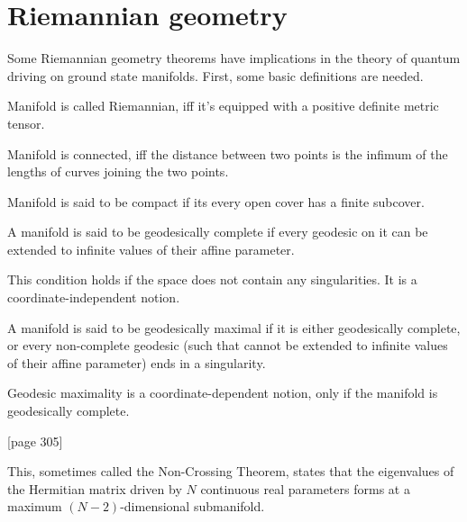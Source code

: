 
\section{Riemannian geometry}
Some Riemannian geometry theorems have implications in the theory of quantum driving on ground state manifolds. First, some basic definitions are needed.

\begin{definition}
    Manifold is called Riemannian, iff it's equipped with a positive definite metric tensor.
\end{definition}
\begin{definition}
    Manifold is connected, iff the distance between two points is the infimum of the lengths of curves joining the two points.
\end{definition}
\begin{definition}
    Manifold is said to be compact if its every open cover has a finite subcover.
\end{definition}
\begin{definition}
    A manifold is said to be geodesically complete if every geodesic on it can be extended to infinite values of their affine parameter. 
\end{definition}
This condition holds if the space does not contain any singularities. It is a coordinate-independent notion.
\begin{definition}
    A manifold is said to be geodesically maximal if it is either geodesically complete, or every non-complete geodesic (such that cannot be extended to infinite values of their affine parameter) ends in a singularity.
\end{definition}
Geodesic maximality is a coordinate-dependent notion, only if the manifold is geodesically complete.


\begin{thm}\citep{landau}[page 305]
    \label{thm:n-2}

    This, sometimes called the Non-Crossing Theorem, states that the eigenvalues of the Hermitian matrix driven by $N$ continuous real parameters forms at a maximum $(N-2)$-dimensional submanifold.
\end{thm}


